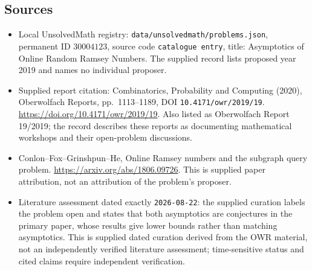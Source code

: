 \documentclass[11pt]{article}
\begin{document}
\subsection{Sources}
\begin{itemize}
\item Local UnsolvedMath registry: \texttt{data/unsolvedmath/problems.json}, permanent ID \(30004123\), source code \texttt{catalogue entry}, title: Asymptotics of Online Random Ramsey Numbers. The supplied record lists proposed year 2019 and names no individual proposer.
\item Supplied report citation: Combinatorics, Probability and Computing (2020), Oberwolfach Reports, pp.\ 1113--1189, DOI \texttt{10.4171/owr/2019/19}. \url{https://doi.org/10.4171/owr/2019/19}. Also listed as Oberwolfach Report 19/2019; the record describes these reports as documenting mathematical workshops and their open-problem discussions.
\item Conlon--Fox--Grinshpun--He, Online Ramsey numbers and the subgraph query problem. \url{https://arxiv.org/abs/1806.09726}. This is supplied paper attribution, not an attribution of the problem's proposer.
\item Literature assessment dated exactly \texttt{2026-08-22}: the supplied curation labels the problem open and states that both asymptotics are conjectures in the primary paper, whose results give lower bounds rather than matching asymptotics. This is supplied dated curation derived from the OWR material, not an independently verified literature assessment; time-sensitive status and cited claims require independent verification.
\end{itemize}
\end{document}
